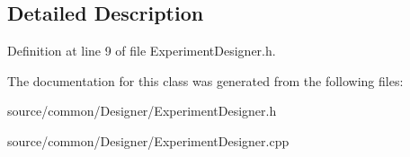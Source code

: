 \subsection{Detailed Description}


Definition at line 9 of file Experiment\-Designer.\-h.



The documentation for this class was generated from the following files\-:\begin{DoxyCompactItemize}
\item 
source/common/\-Designer/Experiment\-Designer.\-h\item 
source/common/\-Designer/Experiment\-Designer.\-cpp\end{DoxyCompactItemize}
